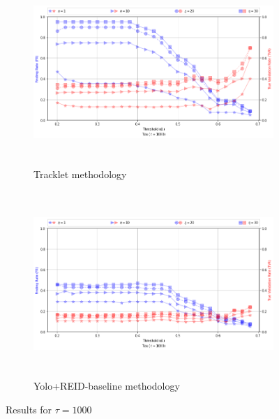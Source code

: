 \documentclass{article}
\begin{document}
\begin{figure}[H]
    \begin{subfigure}{0.9\textwidth}
        \includegraphics[width=12cm, height=7cm]{images_results/tracklet_tau1000_norm.png} 
        \caption{Tracklet methodology}
        \label{fig:subim1}
    \end{subfigure}
    
    \begin{subfigure}{0.9\textwidth}
        \includegraphics[width=12cm, height=7cm]{images_results/yolo_tau1000_norm.png}
        \caption{Yolo+REID-baseline methodology}
        \label{fig:subim2}
    \end{subfigure}

\caption{Results for $\tau = 1000$}
\label{fig:tracklet_tau1000_norm}
\end{figure}
\end{document}
